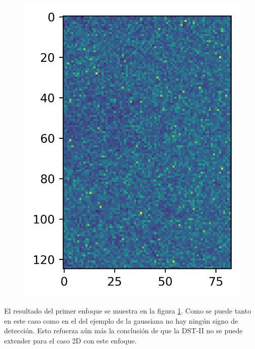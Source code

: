 \begin{figure}
\begin{multicols}{2}
    \includegraphics[width=\linewidth]{Graphics/mm-diagonal.png}\par
\end{multicols}
\caption{} \label{fig:example-mm-approach1}
\end{figure}

El resultado del primer enfoque se muestra en la figura \ref{fig:example-mm-approach1}. Como se puede tanto en este caso como en el
del ejemplo de la gaussiana no hay ningún signo de detección. Esto refuerza aún más la conclusión de que la DST-II no se puede
extender para el caso 2D con este enfoque.

